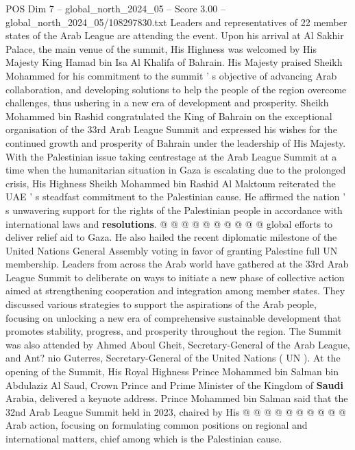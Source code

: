 \begin{textsample}{POS Dim 7 – global\_north\_2024\_05 – Score 3.00 – global\_north\_2024\_05/108297830.txt}  \label{ex:f7_pos_267}
Leaders and representatives of 22 member states of the Arab League are attending the event.
Upon his arrival at Al Sakhir Palace, the main venue of the summit, His Highness was welcomed by His Majesty King Hamad bin Isa Al Khalifa of Bahrain.
His Majesty praised Sheikh Mohammed for his commitment to the summit ' s objective of advancing Arab collaboration, and developing solutions to help the people of the region overcome challenges, thus ushering in a new era of development and prosperity.
Sheikh Mohammed bin Rashid congratulated the King of Bahrain on the exceptional organisation of the 33rd Arab League Summit and expressed his wishes for the continued growth and prosperity of Bahrain under the leadership of His Majesty.
With the Palestinian issue taking centrestage at the Arab League Summit at a time when the humanitarian situation in Gaza is escalating due to the prolonged crisis, His Highness Sheikh Mohammed bin Rashid Al Maktoum reiterated the UAE ' s steadfast commitment to the Palestinian cause.
He affirmed the nation ' s unwavering support for the rights of the Palestinian people in accordance with international laws and \textbf{resolutions}. @ @ @ @ @ @ @ @ @ @ global efforts to deliver relief aid to Gaza.
He also hailed the recent diplomatic milestone of the United Nations General Assembly voting in favor of granting Palestine full UN membership.
Leaders from across the Arab world have gathered at the 33rd Arab League Summit to deliberate on ways to initiate a new phase of collective action aimed at strengthening cooperation and integration among member states.
They discussed various strategies to support the aspirations of the Arab people, focusing on unlocking a new era of comprehensive sustainable development that promotes stability, progress, and prosperity throughout the region.
The Summit was also attended by Ahmed Aboul Gheit, Secretary-General of the Arab League, and Ant? nio Guterres, Secretary-General of the United Nations ( UN ).
At the opening of the Summit, His Royal Highness Prince Mohammed bin Salman bin Abdulaziz Al Saud, Crown Prince and Prime Minister of the Kingdom of \textbf{Saudi} Arabia, delivered a keynote address.
Prince Mohammed bin Salman said that the 32nd Arab League Summit held in 2023, chaired by His @ @ @ @ @ @ @ @ @ @ Arab action, focusing on formulating common positions on regional and international matters, chief among which is the Palestinian cause.

\end{textsample}
